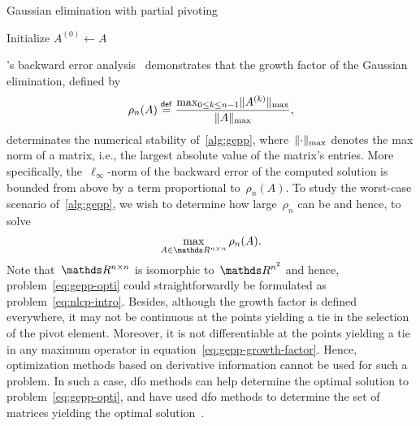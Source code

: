 \begin{algorithm}[htp]
    \caption{Gaussian elimination with partial pivoting}
    \label{alg:gepp}
    \DontPrintSemicolon
    Initialize $A^{(0)} \gets A$\;
\end{algorithm}

's backward error analysis~\cite[eq. (25.14)]{Wilkinson_1963} demonstrates that the growth factor of the Gaussian elimination, defined by
\begin{equation}
    \label{eq:gepp-growth-factor}
    \rho_n(A) \mathrel{\stackrel{\mathsf{def}}{=}} \frac{\max_{0 \le k \le n - 1} \lVert A^{(k)}\rVert_{\max}}{\lVert A\rVert_{\max}},
\end{equation}
determinates the numerical stability of~\cref{alg:gepp}, where~$\lVert\cdot\rVert_{\max}$ denotes the max norm of a matrix, i.e., the largest absolute value of the matrix's entries.
More specifically, the~$\ell_{\infty}$-norm of the backward error of the computed solution is bounded from above by a term proportional to~$\rho_n(A)$.
To study the worst-case scenario of~\cref{alg:gepp}, we wish to determine how large~$\rho_n$ can be and hence, to solve
\begin{equation}
    \label{eq:gepp-opti}
    \max_{A \in \R^{n \times n}} \rho_n(A).
\end{equation}
Note that~$\R^{n \times n}$ is isomorphic to~$\R^{n^2}$ and hence, problem~\cref{eq:gepp-opti} could straightforwardly be formulated as problem~\cref{eq:nlcp-intro}.
Besides, although the growth factor is defined everywhere, it may not be continuous at the points yielding a tie in the selection of the pivot element.
Moreover, it is not differentiable at the points yielding a tie in any maximum operator in equation~\cref{eq:gepp-growth-factor}.
Hence, optimization methods based on derivative information cannot be used for such a problem.
In such a case, \gls{dfo} methods can help determine the optimal solution to problem~\cref{eq:gepp-opti}, and \citeauthor{Higham_Higham_1989} have used \gls{dfo} methods to determine the set of matrices yielding the optimal solution~\cite{Higham_Higham_1989}.

